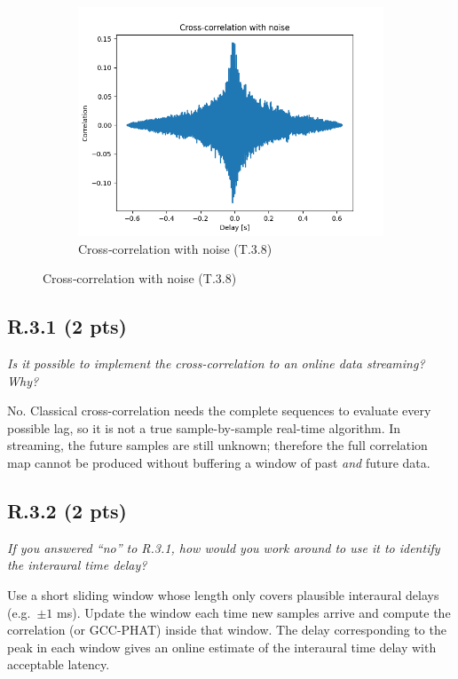 \documentclass{article}
\begin{document}
\begin{figure}[H]
\medskip
\begin{subfigure}{0.45\linewidth}
  \includegraphics[width=\linewidth]{results/figures/task3_8_cross_correlations.png}
  \caption{Cross‑correlation with noise (T.3.8)}
\end{subfigure}
\end{figure}

\subsection*{R.3.1 (2 pts)}
\emph{Is it possible to implement the cross-correlation to an online data streaming? Why?}

No. Classical cross-correlation needs the complete sequences to evaluate every possible lag, so it is not a true sample-by-sample real-time algorithm. In streaming, the future samples are still unknown; therefore the full correlation map cannot be produced without buffering a window of past \emph{and} future data.

\subsection*{R.3.2 (2 pts)}
\emph{If you answered “no” to R.3.1, how would you work around to use it to identify the interaural time delay?}

Use a short sliding window whose length only covers plausible interaural delays (e.g.\ $\pm1$ ms). Update the window each time new samples arrive and compute the correlation (or GCC-PHAT) inside that window. The delay corresponding to the peak in each window gives an online estimate of the interaural time delay with acceptable latency.
\end{document}
